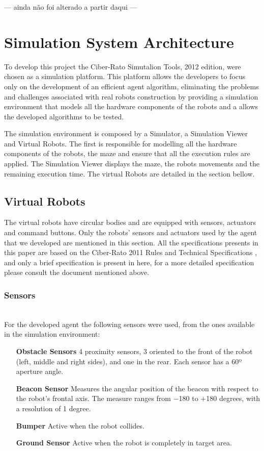 \documentclass[oribibl]{llncs}
\begin{document}
--- ainda não foi alterado a partir daqui ---

\section{Simulation System Architecture}
To develop this project the Ciber-Rato Simutalion Tools, 2012 edition, were chosen as a simulation platform. This platform allows the developers to focus only on the development of an efficient agent algorithm, eliminating the problems and challenges associated with real robots construction by providing a simulation environment that models all the hardware components of the robots and a allows the developed algorithms to be tested\cite{Lau2002}. 

The simulation environment is composed by a Simulator, a Simulation Viewer and Virtual Robots. The first is responsible for modelling all the hardware components of the robots, the maze and ensure that all the execution rules are applied. The Simulation Viewer displays the maze, the robots movements and the remaining execution time. The virtual Robots are detailed in the section bellow.

\subsection{Virtual Robots}
The virtual robots have circular bodies and are equipped with sensors, actuators and command buttons. Only the robots' sensors and actuators used by the agent that we developed are mentioned in this section. All the specifications presents in this paper are based on the Ciber-Rato 2011 Rules and Technical Specifications \cite{DepartamentodeElectronica2011}, and only a brief specification is present in here, for a more detailed specification please consult the document mentioned above.

\subsubsection{Sensors}\hfill \\
For the developed agent the following sensors were used, from the ones available in the simulation environment: 
\begin{itemize}
  \item[\textbf{Obstacle Sensors}]
  4 proximity sensors, 3 oriented to the front of the robot (left, middle and right sides), and one in the rear. Each sensor has a 60º aperture angle.
  \item[\textbf{Beacon Sensor}]
  Measures the angular position of the beacon with respect to the robot’s frontal axis. The measure ranges from −180 to +180 degrees, with a resolution of 1 degree.
  \item[\textbf{Bumper}]Active when the robot collides.
  \item[\textbf{Ground Sensor}]
  Active when the robot is completely in target area.
\end{itemize}
\end{document}
